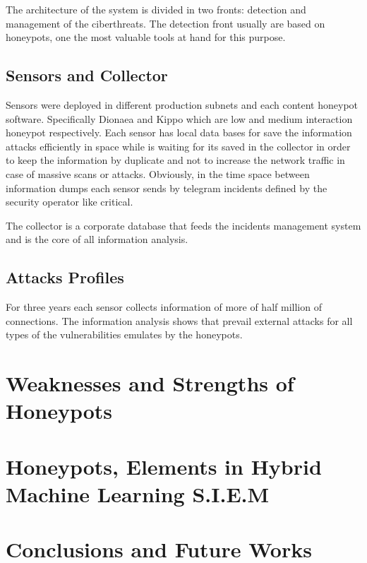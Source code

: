 \documentclass[a4paper]{llncs}
\begin{document}
The architecture of the system is divided in two fronts: detection and management of the ciberthreats. The detection front usually are based on honeypots, one the most valuable tools at hand for this purpose.

\subsection{Sensors and Collector}

Sensors were deployed in different production subnets and each content honeypot software. Specifically Dionaea\cite{dionaea} and Kippo\cite{kippo} which are low and medium interaction honeypot respectively. Each sensor has local data bases for save the information attacks efficiently in space while is waiting for its saved in the collector in order to keep the information by duplicate and not to increase the network traffic in case of massive scans or attacks. Obviously, in the time space between information dumps each sensor sends by telegram incidents defined by the security operator like critical.

The collector is a corporate database that feeds the incidents management system and is the core of all information analysis.

\subsection{Attacks Profiles}

For three years each sensor collects information of more of half million of connections. The information analysis shows that prevail external attacks for all types of the vulnerabilities emulates by the honeypots.


\section{Weaknesses and Strengths of Honeypots}

\section{Honeypots, Elements in Hybrid Machine Learning S.I.E.M}

\section{Conclusions and Future Works}
\end{document}
